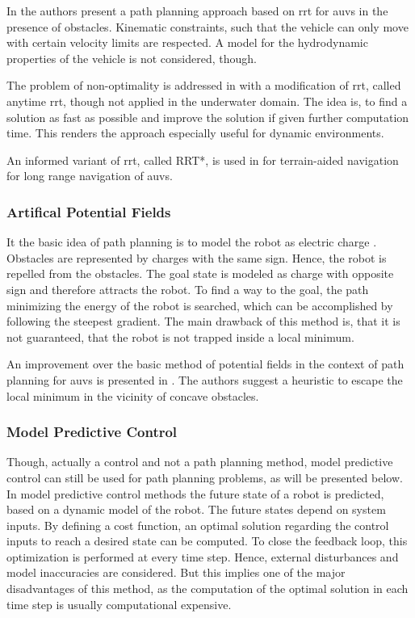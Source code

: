 In \cite{Young13} the authors present a path planning approach based on \ac{rrt} for \acp{auv} in the presence of obstacles. Kinematic constraints, such that the vehicle can only move with certain velocity limits are respected. A model for the hydrodynamic properties of the vehicle is not considered, though.

The problem of non-optimality is addressed in \cite{Karaman11} with a modification of \ac{rrt}, called anytime \ac{rrt}, though not applied in the underwater domain. The idea is, to find a solution as fast as possible and improve the solution if given further computation time. This renders the approach especially useful for dynamic environments.

An informed variant of \ac{rrt}, called RRT*, is used in \cite{Ma18} for terrain-aided navigation for long range navigation of \acp{auv}.

\subsubsection{Artifical Potential Fields}
It the basic idea of path planning is to model the robot as electric charge \cite{Gomez15}. Obstacles are represented by charges with the same sign. Hence, the robot is repelled from the obstacles. The goal state is modeled as charge with opposite sign and therefore attracts the robot. To find a way to the goal, the path minimizing the energy of the robot is searched, which can be accomplished by following the steepest gradient. The main drawback of this method is, that it is not guaranteed, that the robot is not trapped inside a local minimum. 

An improvement over the basic method of potential fields in the context of path planning for \acp{auv} is presented in \cite{Fu-guang05}. The authors suggest a heuristic to escape the local minimum in the vicinity of concave obstacles.

\subsubsection{Model Predictive Control}

Though, actually a control and not a path planning method, model predictive control can still be used for path planning problems, as will be presented below. In model predictive control methods the future state of a robot is predicted, based on a dynamic model of the robot. The future states depend on system inputs. By defining a cost function, an optimal solution regarding the control inputs to reach a desired state can be computed. To close the feedback loop, this optimization is performed at every time step. Hence, external disturbances and model inaccuracies are considered. But this implies one of the major disadvantages of this method, as the computation of the optimal solution in each time step is usually computational expensive.

